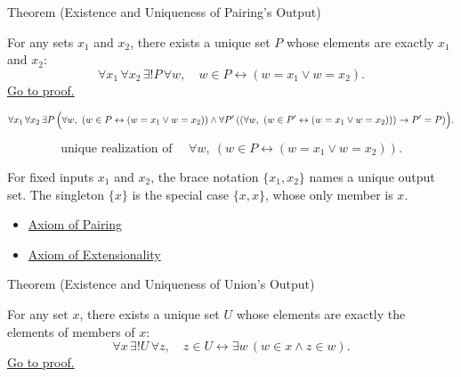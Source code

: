 \begin{theorembox}{Theorem (Existence and Uniqueness of Pairing's Output)}
\begin{theorem}\label{thm:pairing-output-exists-unique}
For any sets $x_1$ and $x_2$, there exists a unique set $P$ whose elements are
exactly $x_1$ and $x_2$:
\[
  \forall x_1\,\forall x_2\,\exists! P\,\forall w,\quad
  w\in P\leftrightarrow (w=x_1\vee w=x_2).
\]
\hyperref[prf:pairing-output-exists-unique]{Go to proof.}
\end{theorem}
\end{theorembox}



\begin{remark*}
\[
  \forall x_1\,\forall x_2\,\exists P\,
  \Bigl(
  \forall w,\ (w\in P\leftrightarrow(w=x_1\vee w=x_2))
  \wedge
  \forall P'\,
  ((\forall w,\ (w\in P'\leftrightarrow(w=x_1\vee w=x_2)))\to P'=P)
  \Bigr).
\]
\end{remark*}

\begin{remark*}
\[
  \text{unique realization of }\quad
  \forall w,\ (w\in P\leftrightarrow(w=x_1\vee w=x_2)).
\]
\end{remark*}

\begin{remark*}[Interpretation]
For fixed inputs \(x_1\) and \(x_2\), the brace notation
\(\{x_1,x_2\}\) names a unique output set. The singleton \(\{x\}\) is the
special case \(\{x,x\}\), whose only member is \(x\).
\end{remark*}

\begin{dependencies}
\begin{itemize}
  \item \hyperref[ax:pairing]{Axiom of Pairing}
  \item \hyperref[ax:extensionality]{Axiom of Extensionality}
\end{itemize}
\end{dependencies}

\begin{theorembox}{Theorem (Existence and Uniqueness of Union's Output)}
\begin{theorem}\label{thm:union-output-exists-unique}
For any set $x$, there exists a unique set $U$ whose elements are exactly the
elements of members of $x$:
\[
  \forall x\,\exists! U\,\forall z,\quad
  z\in U\leftrightarrow \exists w\,(w\in x\wedge z\in w).
\]
\hyperref[prf:union-output-exists-unique]{Go to proof.}
\end{theorem}
\end{theorembox}


